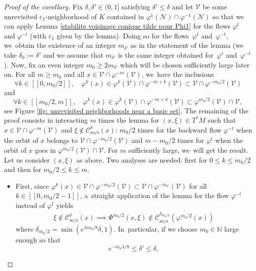 \documentclass[11pt]{article}
\newcommand{\lcr}{[\![}
\newcommand{\rcr}{]\!]}
\newcommand{\rs}{\mathrm{s}}
\newcommand{\rso}{\mathrm{so}}
\theoremstyle{definition}
\theoremstyle{plain}
\newcommand{\Ccal}{\mathcal{C}}
\newcommand{\Ncal}{\mathcal{N}}
\newcommand{\N}{\mathbb{N}}
\newcommand{\Vcal}{\mathcal{V}}
\begin{document}
\begin{proof}[Proof of the corollary]
Fix $\delta,\delta'\in(0,1]$ satisfying $\delta' \leq \delta$ and let $\Vcal$ be some unrevisited $\varepsilon_1$\nobreakdash-neighborhood of $K$ contained in $\varphi^1(\Ncal) \cap \varphi^{-1} (\Ncal)$ so that we can apply Lemma \ref{stabilite voisinage conique tilde pour Phi1} for the flows $\varphi^t$ and $\varphi^{-t}$ (with $\varepsilon_1$ given by the lemma). Doing so for the flows~$\varphi^t$ and~$\varphi^{-t}$, we~obtain the existence of an integer $m_{\delta'}$ as in the statement of the lemma (we take $\delta_0:= \delta'$ and we assume that $m_{\delta'}$ is the same integer obtained for~$\varphi^t$ and~$\varphi^{-t}$). Now, fix an even integer $m_0 \geq 2m_{\delta'}$ which will be chosen sufficiently large later on. For all $m \geq m_{0}$ and all $x \in \Vcal \cap \varphi^{-m} (\Vcal)$, we~have the inclusions
\[
\forall k \in \lcr 0, m_0 /2 \rcr, \quad \varphi^{k} (x) \in \varphi^k (\Vcal) \cap \varphi^{-m + k} (\Vcal) \subset \Vcal \cap \varphi^{- m_{0}/2} (\Vcal)
\]
and
\[
\forall k \in \lcr m_0/2, m \rcr, \quad \varphi^{k} (x) \in \varphi^k (\Vcal) \cap \varphi^{-m + k} (\Vcal) \subset \varphi^{m_{0}/2} (\Vcal) \cap \Vcal,
\]
see Figure \ref{fig: unrevisited neighborhoods near a basic set}. The remaining of the proof consists in interacting $m$ times the lemma for $(x,\xi) \in T^* M$ such that $x \in \Vcal \cap \varphi^{-m} (\Vcal)$ and $\xi \notin \Ccal_{\rso/\rs}^{\delta} (x)$: $m_0/2$ times for the backward flow $\varphi^{-t}$ when the orbit of $x$ belongs to $\Vcal \cap \varphi^{- m_0/2} (\Vcal)$ and $m - m_0/2$ times for $\varphi^t$ when the orbit of $x$ goes in $ \varphi^{m_{0}/2} (\Vcal) \cap \Vcal$. For $m$ sufficiently large, we~will get the result. Let us consider $(x,\xi)$ as above. Two analyses are needed: first for $0 \leq k \leq m_0/2$ and then for $m_0/2 \leq k \leq m$.
\begin{itemize}
\item First, since $\varphi^k (x) \in \Vcal \cap \varphi^{- m_{0}/2} (\Vcal) \subset \Vcal \cap \varphi^{- m_{\delta'}} (\Vcal)$ for all $k \in \lcr 0, m_0 /2-1 \rcr$, a~straight application of the lemma for the flow $\varphi^{-t}$ instead of $\varphi^t$ yields
\[
\xi \notin \overline{\Ccal_{\rso/\rs}^{\delta} (x)} \implies \Phi^{m_0/2} (x,\xi) \notin \overline{\Ccal_{\rso/\rs}^{\delta_{m_0/2}} (\varphi^{m_0/2}(x))}
\]
where $\delta_{m_0/2} = \min (e^{\lambda m_0 /8} \delta, 1)$. In~particular, if we choose $m_0 \in \N$ large enough so that
\[
e^{-m_0 \lambda /8} \leq \delta' \leq \delta,
\]
\end{itemize}
\end{proof}
\end{document}
